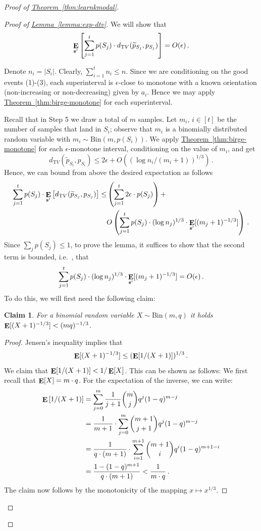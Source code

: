 \documentclass[10pt]{article}
\newtheorem{claim}[theorem]{Claim}
\theoremstyle{definition}
\providecommand{\ie}{i.e.\ }
\numberwithin{equation}{section}
\newcommand{\expref}[2]{\texorpdfstring{\hyperref[#2]{#1~\ref{#2}}}{#1~\ref{#2}}}
\DeclareMathOperator*{\E}{{\bf E}}
\newcommand{\dtv}{d_{\mathrm TV}}
\newcommand{\eps}{\epsilon}
\begin{document}
\begin{proof}[Proof of \expref{Theorem}{thm:learnkmodal}]
\begin{proof}[Proof of \expref{Lemma}{lemma:exp-dtv}]
We will show that
$$
\E_{\mathbf{s}'} \left[  \sum_{j=1}^{t} p(S_j) \cdot \dtv (\widetilde{p}_{S_j}, p_{S_j}) \right] = O(\eps)\,.
$$

Denote $n_i = |S_i|$. Clearly,  $\sum_{i=1}^{t} n_i \leq n$.
Since we are conditioning on the good events (1)-(3), each superinterval is
$\eps$-close to monotone with a known orientation (non-increasing or
non-decreasing) given by $a_i$.  Hence we may apply \expref{Theorem}{thm:birge-monotone} for each superinterval.

Recall that in Step 5 we draw a total of $m$ samples. Let $m_i$, $i \in [t]$ be the number of samples that land in $S_i$;
observe that $m_i$ is a binomially distributed random variable with
$m_i \sim \mathrm{Bin}(m, p(S_i))$.
We apply \expref{Theorem}{thm:birge-monotone} for each $\eps$-monotone interval,
conditioning on the value of $m_i$, and get
$$ \dtv (\widetilde{p}_{S_i}, p_{S_i})  \leq 2 \eps +  O\left( (\log n_i / (m_i+1))^{1/3} \right)\,.$$ Hence, we can bound from above
the desired expectation as follows
\begin{equation*}
  \begin{split}
    \sum_{j=1}^{t} p(S_j) \cdot \E_{\mathbf{s}'} \left[ \dtv (\widetilde{p}_{S_j}, p_{S_j}) \right]
    \leq& \left(\sum_{j=1}^{t} 2 \eps \cdot p(S_j) \right) + \\
    &O\left(\sum_{j=1}^{t} p(S_j) \cdot  (\log n_j)^{1/3} \cdot
      \E_{\mathbf{s}'} [ (m_j+1)^{-1/3}]\right)\,.
  \end{split}
\end{equation*}
Since $\sum_jp(S_j) \leq 1$, to prove the lemma, it suffices to show that the second term is bounded, \ie,
that
$$\sum_{j=1}^{t} p(S_j) \cdot  (\log n_j)^{1/3} \cdot \E_{\mathbf{s}'} [ (m_j+1)^{-1/3}] = O(\eps)\,.$$
To do this, we will first need the following claim:
\begin{claim} \label{claim:binomial}
For a binomial random variable $X \sim \mathrm{Bin}(m,q)$ it holds $\E [ (X+1)^{-1/3} ] <(mq)^{-1/3}$.
\end{claim}

\begin{proof} %
Jensen's inequality %
implies that $$\E [(X+1)^{-1/3}] \leq  (\E [1/(X+1)])^{1/3}\,.$$
We claim that $\E [1/(X+1)] < 1/\E[X]$. This can be shown as follows:
We first recall that $\E[X] = m \cdot q$. For the expectation of the inverse,
we can write:
%
%
%
%
\begin{align*}
\E\left[1/(X+1)\right]  &= \sum_{j=0}^m {\frac{1}{j+1} \binom{m}{j}q^j (1-q)^{m-j}} \\
&= \frac{1}{m+1}
\cdot \sum_{j=0}^m {\binom{m+1}{j+1} q^j (1-q)^{m-j}}\\
&=  \frac{1}{q \cdot (m+1)} \cdot \sum_{i=1}^{m+1} {\binom{m+1}{i} q^i (1-q)^{m+1-i}} \\
&= \frac{1 - (1-q)^{m+1}}{q \cdot (m+1)}  < \frac{1}{m \cdot q}\,.
\end{align*}
The claim now follows by the monotonicity of the mapping $x \mapsto x^{1/3}$.
\end{proof}
%


\end{proof}
\end{proof}
\end{document}
